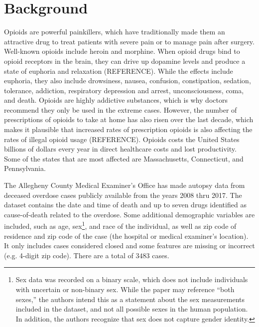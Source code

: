 \documentclass{article}
\begin{document}
\section{Background}
Opioids are powerful painkillers, which have traditionally made them an attractive drug to treat patients with severe pain or to manage pain after surgery. Well-known opioids include heroin and morphine. When opioid drugs bind to opioid receptors in the brain, they can drive up dopamine levels and produce a state of euphoria and relaxation (REFERENCE). While the effects include euphoria, they also include drowsiness, nausea, confusion, constipation, sedation, tolerance, addiction, respiratory depression and arrest, unconsciousness, coma, and death. Opioids are highly addictive substances, which is why doctors recommend they only be used in the extreme cases. However, the number of prescriptions of opioids to take at home has also risen over the last decade, which makes it plausible that increased rates of prescription opioids is also affecting the rates of illegal opioid usage (REFERENCE). Opioids costs the United States billions of dollars every year in direct healthcare costs and lost productivity. Some of the states that are most affected are Massachusetts, Connecticut, and Pennsylvania.

The Allegheny County Medical Examiner's Office has made autopsy data from deceased overdose cases publicly available from the years 2008 thru 2017. The dataset contains the date and time of death and up to seven drugs identified as cause-of-death related to the overdose. Some additional demographic variables are included, such as age, sex\footnote{Sex data was recorded on a binary scale, which does not include individuals with uncertain or non-binary sex. While the paper may reference ``both sexes,'' the authors intend this as a statement about the sex measurements included in the dataset, and not all possible sexes in the human population. In addition, the authors recognize that sex does not capture gender identity.}, and race of the individual, as well as zip code of residence and zip code of the case (the hospital or medical examiner's location). It only includes cases considered closed and some features are missing or incorrect (e.g. 4-digit zip code). There are a total of $3483$ cases.
\end{document}
